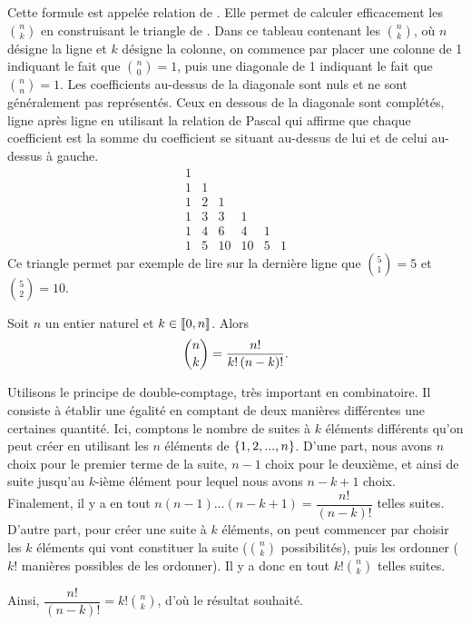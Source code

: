 \documentclass{magnolia}
\begin{document}
\begin{remarqueUnique}
\remarque Cette formule est appelée relation de . Elle permet de calculer
  efficacement les $\binom{n}{k}$ en construisant le triangle de . Dans ce
  tableau contenant les $\binom{n}{k}$, où $n$ désigne la ligne et $k$ désigne la colonne,
  on commence par placer une colonne de 1 indiquant le fait que $\binom{n}{0}=1$, puis une diagonale
  de 1 indiquant le fait que $\binom{n}{n}=1$. Les coefficients au-dessus de la diagonale sont nuls
  et ne sont généralement pas représentés. Ceux en dessous de la diagonale sont complétés, ligne
  après ligne en utilisant la relation de Pascal qui affirme que chaque coefficient est la somme
  du coefficient se situant au-dessus de lui et de celui au-dessus à gauche.
  \[\begin{matrix}
    1 &   &    &    &   &  \\
    1 & 1 &    &    &   &  \\
    1 & 2 &  1 &    &   &  \\
    1 & 3 &  3 &  1 &   &  \\
    1 & 4 &  6 &  4 & 1 &  \\
    1 & 5 & 10 & 10 & 5 & 1
    \end{matrix}\]
  Ce triangle permet par exemple de lire sur la dernière ligne que $\binom{5}{1}=5$ et $\binom{5}{2}=10$.
\end{remarqueUnique}

\begin{proposition}[utile=-3]
Soit $n$ un entier naturel et $k\in\left\llbracket 0,n\right\rrbracket$. Alors
\[\binom{n}{k}=\frac{n!}{k!\left(n-k\right)!}.\]
\end{proposition}

\begin{preuve}
Utilisons  le  principe  de double-comptage, très  important  en  combinatoire.  Il consiste à établir une égalité en comptant de deux manières différentes une certaines quantité. Ici, comptons le nombre de suites à $k$ éléments différents qu'on peut créer en utilisant les $n$ éléments de $\left\{1, 2, . . . ,n\right\}$. D'une part, nous avons $n$ choix pour le premier terme de la suite, $n-1$ choix pour le deuxième, et ainsi de suite jusqu'au $k$-ième élément pour lequel nous avons $n-k+1$ choix. Finalement, il y a en tout $n(n-1)\ldots(n-k+1) =\dfrac{n!}{(n-k)!}$ telles suites. D'autre part, pour créer une suite à $k$ éléments, on peut commencer par choisir les $k$ éléments qui vont constituer la suite ($\binom{n}{k}$ possibilités), puis les ordonner ($k!$ manières possibles de les ordonner). Il y a donc en tout $k!\binom{n}{k}$ telles suites.

Ainsi, $\dfrac{n!}{(n-k)!}=k!\binom{n}{k}$, d'où le résultat souhaité.

\end{preuve}
\end{document}

